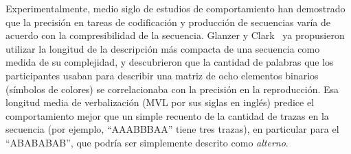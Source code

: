 
Experimentalmente, medio siglo de estudios de comportamiento han demostrado que la precisión en tareas de codificación y producción de secuencias varía de acuerdo con la compresibilidad de la secuencia. Glanzer y Clark~\cite{f35} ya propusieron utilizar la longitud de la descripción más compacta de una secuencia como medida de su complejidad, y descubrieron que la cantidad de palabras que los participantes usaban para describir una matriz de ocho elementos binarios (símbolos de colores) se correlacionaba con la precisión en la reproducción. Esa longitud media de verbalización (MVL por sus siglas en inglés) predice el comportamiento mejor que un simple recuento de la cantidad de trazas en la secuencia (por ejemplo, ``AAABBBAA'' tiene tres trazas), en particular para el ``ABABABAB'', que podría ser simplemente descrito como \textit{alterno}.


